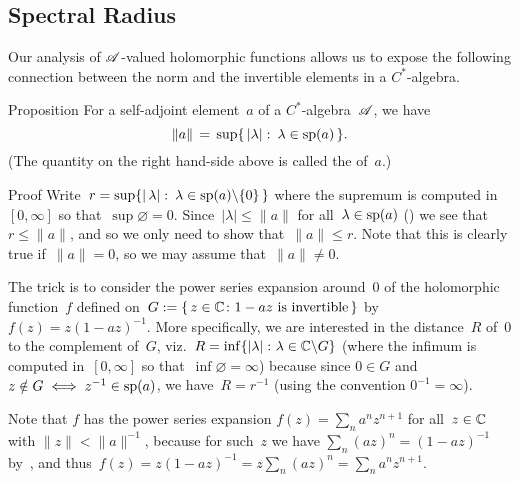 \documentclass[a]{subfiles}
\begin{document}
\subsection{Spectral Radius}
\begin{parsec}%
\begin{point}%
Our analysis of $\mathscr{A}$-valued
holomorphic functions
allows us to expose
the following connection
between the norm
and the invertible elements
in a $C^*$-algebra.
\end{point}
\begin{point}{Proposition}%
For a self-adjoint element~$a$ of a $C^*$-algebra~$\mathscr{A}$,
we have
\begin{equation*}
\|a\|\,=\,\sup\{\,\left|\lambda\right|\colon 
\,\lambda\in \mathrm{sp}(a)\,\}.
\end{equation*}
(The quantity on the right hand-side above
is called the  of~$a$.)%
\begin{point}{Proof}%
Write~$r=
\sup\{\left|\,\lambda\right|\colon\, \lambda\in \mathrm{sp}(a)\backslash\{0\}\,\}$
where the supremum is computed
in~$[0,\infty]$ so that~$\sup\varnothing=0$.
Since~$\left|\lambda\right| \leq \|a\|$
for all~$\lambda\in\mathrm{sp}(a)$
()
we see that~$r\leq \|a\|$,
and so we only need to show that~$\|a\|\leq r$. 
Note that this is clearly true if~$\|a\|=0$,
so we may assume that~$\|a\|\neq 0$.

The trick is to consider
the power series expansion
around~$0$ of the holomorphic function~$f$ defined
on~$G:=\{\,z\in \mathbb{C}\colon 1-az\text{ is invertible}\,\}$ 
by  $f(z)=z(1-az)^{-1}$.
More specifically,
we are interested in the distance~$R$
of~$0$ to the complement of~$G$,
viz.~$R= \inf\{\left|\lambda\right|\colon \lambda\in \mathbb{C}\backslash G\}$
(where the infimum is computed in~$[0,\infty]$
so that~$\inf\varnothing=\infty$)
because since $0\in G$
and $z\notin G\iff z^{-1}\in \mathrm{sp}(a)$,
we have~$R=r^{-1}$
(using the convention $0^{-1}=\infty$).

Note that $f$ has the power series expansion
$f(z) = \sum_n a^nz^{n+1}$
for all~$z\in \mathbb{C}$ with $\|z\|<\|a\|^{-1}$,
because for such~$z$
we have $\sum_n (az)^n=(1-az)^{-1}$
by~,
and thus~$f(z)=z(1-az)^{-1}=z\sum_n (az)^n = \sum_n a^nz^{n+1}$.


\end{point}
\end{point}
\end{parsec}
\end{document}
